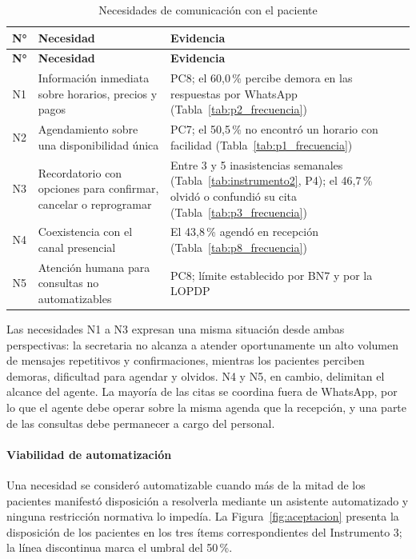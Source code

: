 \begingroup
\fontsize{9}{11}\selectfont
\renewcommand{\arraystretch}{1.2}
\setlength{\LTpre}{0pt}\setlength{\LTpost}{6pt}
\begin{longtable}{|c|p{4.6cm}|p{8.2cm}|}
\caption{Necesidades de comunicación con el paciente}
\label{tab:necesidades} \\
\hline
\textbf{N°} & \textbf{Necesidad} & \textbf{Evidencia} \\ \hline
\endfirsthead
\hline
\textbf{N°} & \textbf{Necesidad} & \textbf{Evidencia} \\ \hline
\endhead
N1 & Información inmediata sobre horarios, precios y pagos & PC8; el 60,0\,\% percibe demora en las respuestas por WhatsApp (Tabla~\ref{tab:p2_frecuencia}) \\ \hline
N2 & Agendamiento sobre una disponibilidad única & PC7; el 50,5\,\% no encontró un horario con facilidad (Tabla~\ref{tab:p1_frecuencia}) \\ \hline
N3 & Recordatorio con opciones para confirmar, cancelar o reprogramar & Entre 3 y 5 inasistencias semanales (Tabla~\ref{tab:instrumento2}, P4); el 46,7\,\% olvidó o confundió su cita (Tabla~\ref{tab:p3_frecuencia}) \\ \hline
N4 & Coexistencia con el canal presencial & El 43,8\,\% agendó en recepción (Tabla~\ref{tab:p8_frecuencia}) \\ \hline
N5 & Atención humana para consultas no automatizables & PC8; límite establecido por BN7 y por la LOPDP \\ \hline
\end{longtable}
\endgroup

Las necesidades N1 a N3 expresan una misma situación desde ambas perspectivas: la secretaria no alcanza a atender oportunamente un alto volumen de mensajes repetitivos y confirmaciones, mientras los pacientes perciben demoras, dificultad para agendar y olvidos. N4 y N5, en cambio, delimitan el alcance del agente. La mayoría de las citas se coordina fuera de WhatsApp, por lo que el agente debe operar sobre la misma agenda que la recepción, y una parte de las consultas debe permanecer a cargo del personal.

\paragraph{Viabilidad de automatización}

Una necesidad se consideró automatizable cuando más de la mitad de los pacientes manifestó disposición a resolverla mediante un asistente automatizado y ninguna restricción normativa lo impedía. La Figura~\ref{fig:aceptacion} presenta la disposición de los pacientes en los tres ítems correspondientes del Instrumento 3; la línea discontinua marca el umbral del 50\,\%.

